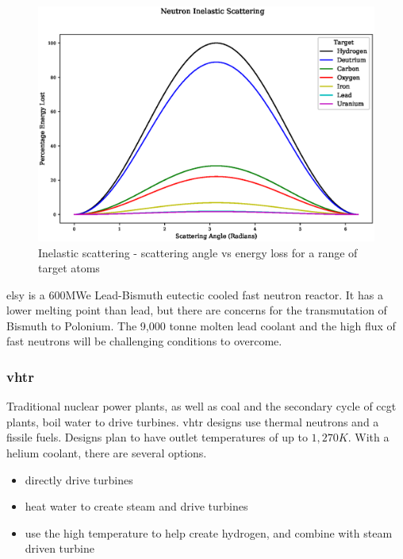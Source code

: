 \begin{figure}[htbp]
  \begin{center}
    \includegraphics[width=0.8\linewidth]{chapters/introduction/plots/neutron_scattering/neutron_scattering.eps}
    \caption{Inelastic scattering - scattering angle vs energy loss for a range of target atoms}
    \label{fig:inelasticscattering}
  \end{center}
\end{figure}

\acrfull{elsy} is a 600MWe Lead-Bismuth \gls{eutectic} cooled fast neutron reactor.  It has a lower melting point than lead, but there are concerns for the transmutation of Bismuth to Polonium.  The 9,000 tonne molten lead coolant and the high flux of fast neutrons\cite{lanltour} will be challenging conditions to overcome.



\FloatBarrier
\subsubsection{\acrshort{vhtr}}

Traditional nuclear power plants, as well as coal and the secondary cycle of \acrshort{ccgt} plants, boil water to drive turbines.  \acrfull{vhtr} designs use thermal neutrons and a fissile fuels.  Designs plan to have outlet temperatures of up to $1,270K$\cite{genivgifvhtr}.  With a helium coolant, there are several options.

\begin{itemize}
\item directly drive turbines
\item heat water to create steam and drive turbines
\item use the high temperature to help create hydrogen, and combine with steam driven turbine
\end{itemize}

